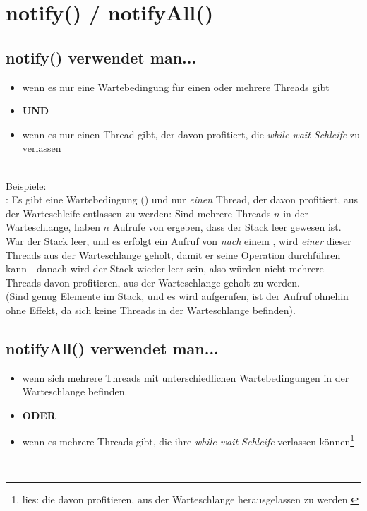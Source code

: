 \section{notify() / notifyAll()}

\subsection*{notify() verwendet man...}
\begin{itemize}
    \item wenn es nur eine Wartebedingung für einen oder mehrere Threads gibt
    \item[] \textbf{UND}
    \item wenn es nur einen Thread gibt, der davon profitiert, die \textit{while-wait-Schleife} zu verlassen
\end{itemize}\\

\noindent
Beispiele:\\

\noindent
{}: Es gibt eine Wartebedingung () und nur \textit{einen} Thread, der davon profitiert, aus der Warteschleife entlassen zu werden: Sind mehrere Threads $n$ in der Warteschlange,  haben $n$ Aufrufe von  ergeben, dass der Stack leer gewesen ist.\\
War der Stack leer, und es erfolgt ein Aufruf von  \textit{nach} einem , wird \textit{einer} dieser Threads aus der Warteschlange geholt, damit er seine Operation durchführen kann - danach wird der Stack wieder leer sein, also würden nicht mehrere Threads davon profitieren, aus der Warteschlange geholt zu werden.\\
(Sind genug Elemente im Stack, und es wird  aufgerufen, ist der Aufruf ohnehin ohne Effekt, da sich keine Threads in der Warteschlange befinden).

\subsection*{notifyAll() verwendet man...}
\begin{itemize}
    \item wenn sich mehrere Threads mit unterschiedlichen Wartebedingungen in der Warteschlange befinden.
    \item[] \textbf{ODER}
    \item wenn es mehrere Threads gibt, die ihre \textit{while-wait-Schleife} verlassen können\footnote{
    lies: die davon profitieren, aus der Warteschlange herausgelassen zu werden.
    }
\end{itemize}\\

